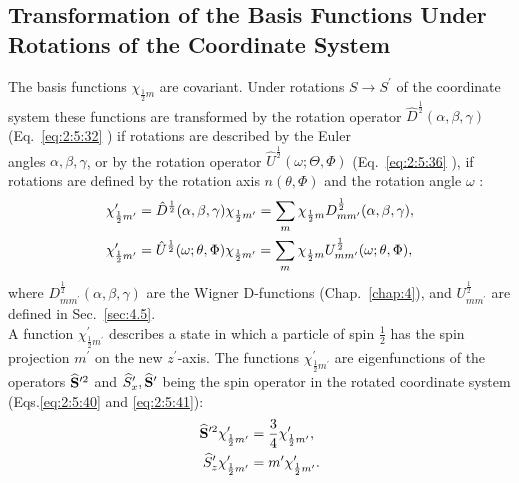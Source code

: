 \subsection{Transformation of the Basis Functions Under Rotations of the Coordinate System}\label{sec:6.2.4}
The basis functions $\chi_{\frac{1}{2} m}$ are covariant. Under rotations $S \rightarrow S^{\prime}$ of the coordinate system these functions are transformed by the rotation operator $\widehat{D}^{\frac{1}{2}}(\alpha, \beta, \gamma)$ (Eq.~\eqref{eq:2:5:32} ) if rotations are described by the Euler\\
angles $\alpha, \beta, \gamma$, or by the rotation operator $\widehat{U}^{\frac{1}{2}}(\omega ; \Theta, \Phi)$ (Eq.~\eqref{eq:2:5:36}
 ), if rotations are defined by the rotation axis $n(\theta, \Phi)$ and the rotation angle $\omega$ :
\begin{align}
& \chi_{\frac{1}{2} m^{\prime}}^{\prime}=\hat{D}^{\frac{1}{2}}(\alpha, \beta, \gamma) \chi_{\frac{1}{2} m^{\prime}}=\sum_{m} \chi_{\frac{1}{2} m} D_{m m^{\prime}}^{\frac{1}{2}}(\alpha, \beta, \gamma) , \notag\\
& \chi_{\frac{1}{2} m^{\prime}}^{\prime}=\hat{U}^{\frac{1}{2}}(\omega ; \theta, \Phi) \chi_{\frac{1}{2} m^{\prime}}=\sum_{m} \chi_{\frac{1}{2} m} U_{m m^{\prime}}^{\frac{1}{2}}(\omega ; \theta, \Phi), \label{eq:6:2:15}
\end{align}
where $D_{m m^{\prime}}^{\frac{1}{2}}(\alpha, \beta, \gamma)$ are the Wigner D-functions (Chap.~\ref{chap:4}), and $U_{m m^{\prime}}^{\frac{1}{2}}$ are defined in Sec.~\ref{sec:4.5}.\\
A function $\chi_{\frac{1}{2} m^{\prime}}^{\prime}$ describes a state in which a particle of spin $\frac{1}{2}$ has the spin projection $m^{\prime}$ on the new $z^{\prime}$-axis. The functions $\chi_{\frac{1}{2} m^{\prime}}^{\prime}$ are eigenfunctions of the operators $\widehat{\mathbf{S}}^{\prime 2}$ and $\widehat{S}_{x}^{\prime}, \widehat{\mathbf{S}}^{\prime}$ being the spin operator in the rotated coordinate system (Eqs.\eqref{eq:2:5:40} and \eqref{eq:2:5:41}):
\begin{align}
\widehat{\mathbf{S}}^{\prime 2} \chi_{\frac{1}{2} m^{\prime}}^{\prime} & =\frac{3}{4} \chi_{\frac{1}{2} m^{\prime}}^{\prime} , \label{eq:6:2:16}\\
\widehat{S}_{z}^{\prime} \chi_{\frac{1}{2} m^{\prime}}^{\prime} & =m^{\prime} \chi_{\frac{1}{2} m^{\prime}}^{\prime}. \notag
\end{align}
